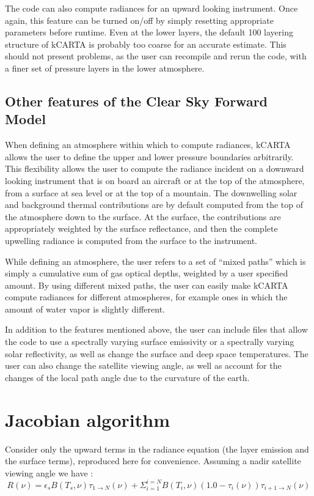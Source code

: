 \documentclass[11pt]{article}
\begin{document}
The code can also compute radiances for an upward looking instrument. Once 
again, this feature can be turned on/off by simply resetting appropriate 
parameters before runtime. Even at the lower layers, the default 100 layering
structure of \textsf{kCARTA} is probably too coarse for an accurate
estimate. This should not present problems, as the user can recompile 
and rerun the code, with a finer set of pressure layers in the lower
atmosphere. 

\subsection{Other features of the Clear Sky Forward Model}

When defining an atmosphere within which to compute radiances, {\sf kCARTA} 
allows the user to define the upper and lower pressure boundaries arbitrarily.
This flexibility allows the user to compute the radiance incident on a 
downward looking instrument that is on board an aircraft or at the top of the 
atmosphere, from a surface at sea level or at the top of a mountain. The 
downwelling solar and background thermal contributions are by default 
computed from the top of the atmosphere down to the surface. At the
surface, the contributions are appropriately weighted by the surface
reflectance, and then the complete upwelling radiance is computed from
the surface to the instrument.

While defining an atmosphere, the user refers to a set of ``mixed
paths'' which is simply a cumulative sum of gas optical depths,
weighted by a user specified amount. By using different mixed paths,
the user can easily make \textsf{kCARTA} compute radiances for different
atmospheres, for example ones in which the amount of water vapor is
slightly different.

In addition to the features mentioned above, the user can include files that 
allow the code to use a spectrally varying surface emissivity or a spectrally 
varying solar reflectivity, as well as change the surface and deep space 
temperatures. The user can also change the satellite viewing angle, as well 
as account for the changes of the local path angle due to the curvature of 
the earth.

\section{Jacobian algorithm}

Consider only the upward terms in the radiance equation (the layer
emission and the surface terms), reproduced here for convenience.
Assuming a nadir satellite viewing angle we have :
\begin{equation}
R(\nu) = \epsilon_{s}B(T_{s},\nu) \tau_{1 \rightarrow N}(\nu) +
\Sigma_{i=1}^{i=N} B(T_{i},\nu) (1.0 - \tau_{i}(\nu)) 
\tau_{i+1 \rightarrow N}(\nu)
\end{equation}
\end{document}
